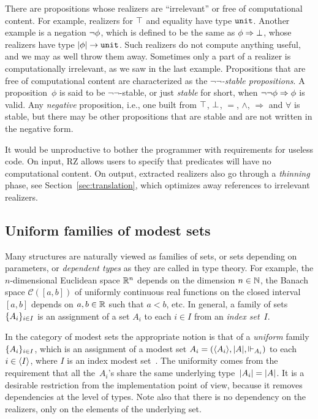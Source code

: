 \iflong
There are propositions whose realizers are ``irrelevant'' or free of
computational content. For example, realizers for $\top$ and
equality have type $\mathtt{unit}$. Another example is a negation
$\lnot \phi$, which is defined to be the same as
$\phi\Rightarrow \bot$, whose realizers have type
$|\phi| \to \mathtt{unit}$. Such realizers do not compute
anything useful, and we may as well throw them away. Sometimes only a
part of a realizer is computationally irrelevant, as we saw in the
last example. Propositions that are free of computational content
are characterized as the \emph{$\lnot\lnot$-stable propositions}. A
proposition~$\phi$ is said to be $\lnot\lnot$-stable, or just
\emph{stable} for short, when $\lnot \lnot \phi\Rightarrow \phi$ is
valid. Any \emph{negative} proposition, i.e., one built from $\top$,
$\bot$, $=$, $\land$, $\Rightarrow$ and $\forall$ is stable, but
there may be other propositions that are stable and are not written
in the negative form.

It would be unproductive to bother the programmer with requirements
for useless code.  On input, RZ allows users to specify that  
predicates will have no computational content.  On output, extracted
realizers also go through a \emph{thinning} phase, see Section~\ref{sec:translation}, which
optimizes away references to irrelevant realizers.
\fi

\iflong
\subsection{Uniform families of modest sets}
\fi %
\label{sec:uniform-families}

Many structures are naturally viewed as families of sets, or sets
depending on parameters, or \emph{dependent types} as they are called
in type theory. For example, the $n$-dimensional Euclidean space
$\mathbb{R}^n$ depends on the dimension $n \in \mathbb{N}$, the Banach space
$\mathcal{C}([a,b])$ of uniformly continuous real functions on the
closed interval $[a,b]$ depends on $a, b \in \mathbb{R}$ such that $a < b$,
etc. In general, a family of sets $\{A_i\}_{i \in I}$ is an
assignment of a set $A_i$ to each $i \in I$ from an \emph{index
  set}~$I$.

In the category of modest sets the appropriate notion is that of a
\emph{uniform} family~$\{A_i\}_{i \in I}$, which is an assignment
of a modest set $A_i = (\langle A_i \rangle, |A|, {\Vdash_{A_i}})$ to each
$i \in \langle I \rangle$, where $I$ is an index modest
set~\cite[6.3]{JacobsB:cltt}. The uniformity comes from the
requirement that all the~$A_i$'s share the same underlying
type~$|A_i| = |A|$. It is a desirable restriction from
the implementation point of view, because it removes dependencies at
the level of types. Note also that there is no dependency on the
realizers, only on the elements of the underlying set.

